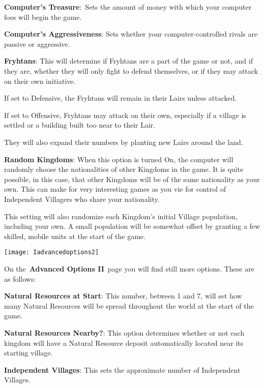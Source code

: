 \textbf{Computer’s Treasure}: Sets the amount of money with which your computer foes will begin the game.

\textbf{Computer’s Aggressiveness}: Sets whether your computer-controlled rivals are passive or aggressive.

\textbf{Fryhtans}: This will determine if Fryhtans are a part of the game or not, and if they are, whether they will only fight to defend themselves, or if they may attack on their own initiative.

\begin{adjustwidth}{1cm}{}
If set to Defensive, the Fryhtans will remain in their Lairs unless attacked.

If set to Offensive, Fryhtans may attack on their own, especially if a village is settled or a building built too near to their Lair. 

They will also expand their numbers by planting new Lairs around the land.
\end{adjustwidth}

\textbf{Random Kingdoms}: When this option is turned On, the computer will randomly choose the nationalities of other Kingdoms in the game. It is quite possible, in this case, that other Kingdoms will be of the same nationality as your own. This can make for very interesting games as you vie for control of Independent Villagers who share your nationality.

This setting will also randomize each Kingdom’s initial Village population, including your own. A small population will be somewhat offset by granting a few skilled, mobile units at the start of the game.

\begin{center}
	\texttt{[image: Iadvancedoptions2]}
\end{center}

On the \textbf{Advanced Options II} page you will find still more options. These are as follows:

\textbf{Natural Resources at Start}: This number, between 1 and 7, will set how many Natural Resources will be spread throughout the world at the start of the game.

\textbf{Natural Resources Nearby?}: This option determines whether or not each kingdom will have a Natural Resource deposit automatically located near its starting village.

\textbf{Independent Villages}: This sets the approximate number of Independent Villages.

